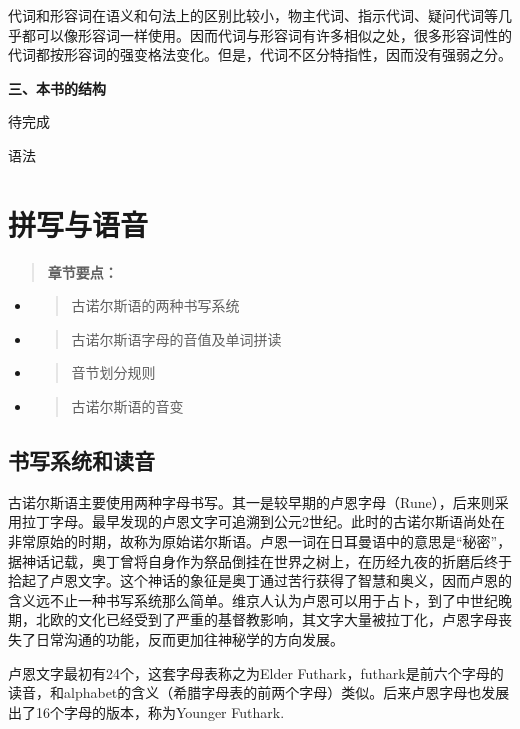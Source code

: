 代词和形容词在语义和句法上的区别比较小，物主代词、指示代词、疑问代词等几乎都可以像形容词一样使用。因而代词与形容词有许多相似之处，很多形容词性的代词都按形容词的强变格法变化。但是，代词不区分特指性，因而没有强弱之分。

\textbf{三、本书的结构}

待完成

语法

\section{拼写与语音}\label{拼写与语音}

\begin{quote}
\textbf{章节要点：}
\end{quote}

\begin{itemize}
\item
  \begin{quote}
  古诺尔斯语的两种书写系统
  \end{quote}
\item
  \begin{quote}
  古诺尔斯语字母的音值及单词拼读
  \end{quote}
\item
  \begin{quote}
  音节划分规则
  \end{quote}
\item
  \begin{quote}
  古诺尔斯语的音变
  \end{quote}
\end{itemize}

\subsection{书写系统和读音}\label{书写系统和读音}

古诺尔斯语主要使用两种字母书写。其一是较早期的卢恩字母（Rune），后来则采用拉丁字母。最早发现的卢恩文字可追溯到公元2世纪。此时的古诺尔斯语尚处在非常原始的时期，故称为原始诺尔斯语。卢恩一词在日耳曼语中的意思是``秘密''，据神话记载，奥丁曾将自身作为祭品倒挂在世界之树上，在历经九夜的折磨后终于拾起了卢恩文字。这个神话的象征是奥丁通过苦行获得了智慧和奥义，因而卢恩的含义远不止一种书写系统那么简单。维京人认为卢恩可以用于占卜，到了中世纪晚期，北欧的文化已经受到了严重的基督教影响，其文字大量被拉丁化，卢恩字母丧失了日常沟通的功能，反而更加往神秘学的方向发展。

卢恩文字最初有24个，这套字母表称之为Elder
Futhark，futhark是前六个字母的读音，和alphabet的含义（希腊字母表的前两个字母）类似。后来卢恩字母也发展出了16个字母的版本，称为Younger
Futhark.


